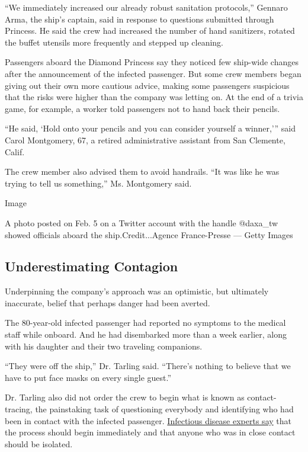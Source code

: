 ``We immediately increased our already robust sanitation protocols,''
Gennaro Arma, the ship's captain, said in response to questions
submitted through Princess. He said the crew had increased the number of
hand sanitizers, rotated the buffet utensils more frequently and stepped
up cleaning.

Passengers aboard the Diamond Princess say they noticed few ship-wide
changes after the announcement of the infected passenger. But some crew
members began giving out their own more cautious advice, making some
passengers suspicious that the risks were higher than the company was
letting on. At the end of a trivia game, for example, a worker told
passengers not to hand back their pencils.

``He said, `Hold onto your pencils and you can consider yourself a
winner,''' said Carol Montgomery, 67, a retired administrative assistant
from San Clemente, Calif.

The crew member also advised them to avoid handrails. ``It was like he
was trying to tell us something,'' Ms. Montgomery said.

Image

A photo posted on Feb. 5 on a Twitter account with the handle @daxa\_tw
showed officials aboard the ship.Credit...Agence France-Presse --- Getty
Images

\hypertarget{underestimating-contagion}{%
\subsection{Underestimating Contagion}\label{underestimating-contagion}}

Underpinning the company's approach was an optimistic, but ultimately
inaccurate, belief that perhaps danger had been averted.

The 80-year-old infected passenger had reported no symptoms to the
medical staff while onboard. And he had disembarked more than a week
earlier, along with his daughter and their two traveling companions.

``They were off the ship,'' Dr. Tarling said. ``There's nothing to
believe that we have to put face masks on every single guest.''

Dr. Tarling also did not order the crew to begin what is known as
contact-tracing, the painstaking task of questioning everybody and
identifying who had been in contact with the infected passenger.
\href{https://www.who.int/publications-detail/operational-considerations-for-managing-covid-19-cases-outbreak-on-board-ships}{Infectious
disease experts say} that the process should begin immediately and that
anyone who was in close contact should be isolated.

